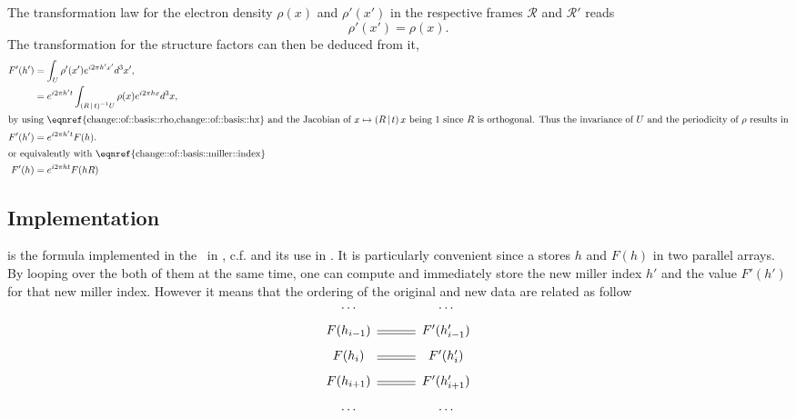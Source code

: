 \documentclass[11pt]{article}
\begin{document}
The transformation law for the electron density $\rho(x)$ and $\rho'(x')$ in the respective frames 
$\mathcal{R}$ and $\mathcal{R}'$ reads
\begin{equation}
\rho'(x') = \rho(x).
\label{eqn:change::of::basis::rho}
\end{equation}
The transformation for the structure factors can then be deduced from it,
\begin{align}
F'(h') &= \int_U \rho'(x') e^{i2\pi h'x'}d^3x', \nonumber\\
&= e^{i2\pi h' t}  \int_{\sym{R}{t}^{-1}U} \rho(x) e^{i2\pi h x} d^3x, \nonumber\\
\intertext{by using \eqnref{change::of::basis::rho,change::of::basis::hx} and the Jacobian of $x \mapsto \sym{R}{t}x$ being 1 since $R$ is orthogonal. Thus the invariance of $U$ and the periodicity of $\rho$ results in}
F'(h') &= e^{i2\pi h't} F(h).
\label{eqn:change::of::basis::F}\\
\intertext{or equivalently with \eqnref{change::of::basis::miller::index}}
F'(h) &= e^{i2\pi ht} F(hR)
\label{eqn:change::of::basis::F::bis}
\end{align}

\subsection{Implementation}

 is the formula implemented in the \cctbx\ in , c.f.  and its use in . It is particularly convenient since a  stores $h$ and $F(h)$ in two parallel arrays. By looping over the both of them at the same time, one can compute and immediately store the new miller index $h'$ and the value $F'(h')$ for that new miller index. However it means that the ordering of the original and new data are related as follow
\begin{equation}
\begin{CD}
\ldots @. \ldots\\
F(h_{i-1}) @= F'(h'_{i-1})\\
F(h_i) @= F'(h'_i)\\
F(h_{i+1}) @= F'(h'_{i+1})\\
\ldots @. \ldots
\end{CD}
\label{eqn:miller::array::change::basis}
\end{equation}
\end{document}
